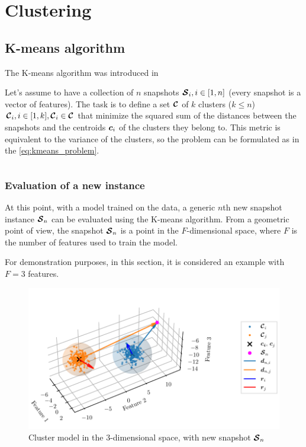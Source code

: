 \chapter{Clustering}
\label{ch:clustering}

\section{K-means algorithm}

The K-means algorithm was introduced in 

Let's assume to have a collection of $n$ snapshots $\bm{\mathcal{S}}_i, i \in [1,n]$ (every snapshot is a vector of features). The task is to define a set $\bm{\mathcal{C}}$ of $k$ clusters ($k \leq n$) $\bm{\mathcal{C}}_i, i \in [1,k], \bm{\mathcal{C}}_i \in \bm{\mathcal{C}}$ that minimize the squared sum of the distances between the snapshots and the centroids $\bm{c}_i$ of the clusters they belong to. This metric is equivalent to the variance of the clusters, so the problem can be formulated as in the \autoref{eq:kmeans_problem}.

\begin{equation}
\label{eq:kmeans_problem}
\end{equation}

\label{sec:kmeans}

\subsection{Evaluation of a new instance}

At this point, with a model trained on the data, a generic $n$th new snapshot instance $\bm{\mathcal{S}}_n$ can be evaluated using the K-means algorithm.
From a geometric point of view, the snapshot $\bm{\mathcal{S}}_n$ is a point in the ${F}$-dimensional space, where ${F}$ is the number of features used to train the model.

For demonstration purposes, in this section, it is considered an example with ${F}=3$ features.

\begin{figure}[htbp]
  \centering
  \includegraphics[width=\textwidth]{images/Spheres_2.pdf}
\caption{Cluster model in the $3$-dimensional space, with new snapshot $\bm{\mathcal{S}}_n$}
\label{fig:clust_spheres}
\end{figure}

